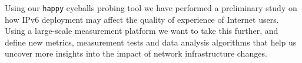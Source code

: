 Using our \texttt{happy} eyeballs probing tool we have performed a preliminary
study on how IPv6 deployment may affect the quality of experience of
Internet users. Using a large-scale measurement platform we want
to take this further, and define new metrics, measurement tests and data
analysis algorithms that help us uncover more insights into the impact of
network infrastructure changes.
